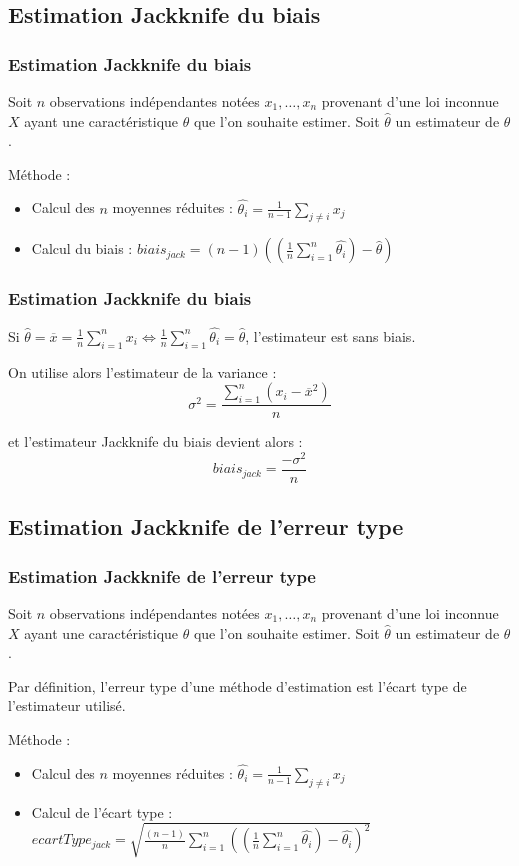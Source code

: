 \documentclass[handout]{beamer}
\begin{document}
		\subsection{Estimation Jackknife du biais}
		\begin{frame}
			\frametitle{Estimation Jackknife du biais}
			Soit $n$ observations indépendantes notées $x_1, \dots, x_n$ provenant d'une loi inconnue $X$ ayant une caractéristique $\theta$ que l'on souhaite estimer. Soit $\hat{\theta}$ un estimateur de $\theta$.

			\vspace{15px}
			Méthode :
			\begin{itemize}
				\item Calcul des $n$ moyennes réduites : $\hat{\theta_i} = \frac{1}{n - 1}\sum\limits_{j \neq i } x_j$
				\item Calcul du biais : $biais_{jack} = (n - 1)((\frac{1}{n} \sum\limits_{i=1}^n \hat{\theta_i}) - \hat{\theta})$
			\end{itemize}


		\end{frame}

		\begin{frame}
			\frametitle{Estimation Jackknife du biais}
			Si $\hat{\theta} = \overline{x} = \frac{1}{n} \sum\limits_{i=1}^n x_i \Leftrightarrow \frac{1}{n} \sum\limits_{i=1}^n \hat{\theta_i} = \hat{\theta}$, l'estimateur est sans biais.

			\vspace{15px}
			On utilise alors l'estimateur de la variance :
			\[\sigma^2 = \frac{\sum\limits_{i=1}^n (x_i - \overline{x}^2)}{n} \]

			et l'estimateur Jackknife du biais devient alors :
			\[biais_{jack} = \frac{-\sigma^2}{n} \]
		\end{frame}

		\subsection{Estimation Jackknife de l'erreur type}
		\begin{frame}
			\frametitle{Estimation Jackknife de l'erreur type}
			Soit $n$ observations indépendantes notées $x_1, \dots, x_n$ provenant d'une loi inconnue $X$ ayant une caractéristique $\theta$ que l'on souhaite estimer. Soit $\hat{\theta}$ un estimateur de $\theta$.

			\vspace{10px}
			Par définition, l'erreur type d'une méthode d'estimation est l'écart type de l'estimateur utilisé.

			\vspace{15px}
			Méthode :
			\begin{itemize}
				\item Calcul des $n$ moyennes réduites : $\hat{\theta_i} = \frac{1}{n - 1}\sum\limits_{j \neq i } x_j$
				\item Calcul de l'écart type : $ecartType_{jack} = \sqrt{\frac{(n - 1)}{n} \sum\limits_{i=1}^n ((\frac{1}{n} \sum\limits_{i=1}^n \hat{\theta_i}) - \hat{\theta_i})^2}$
			\end{itemize}


		\end{frame}
\end{document}
